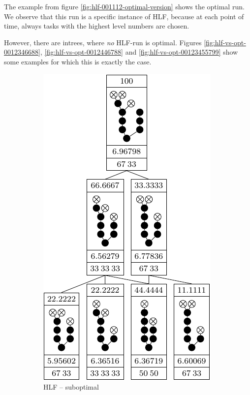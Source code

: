 The example from figure \ref{fig:hlf-001112-optimal-version} shows the optimal run. We observe that this run is a specific instance of HLF, because at each point of time, always tasks with the highest level numbers are chosen.

However, there are intrees, where \emph{no} HLF-run is optimal. Figures \ref{fig:hlf-vs-opt-0012346688}, \ref{fig:hlf-vs-opt-0012446788} and \ref{fig:hlf-vs-opt-00123455799} show some examples for which this is exactly the case.

\begin{figure}[ht]
  \centering
  \begin{subfigure}{.45\linewidth}
    \centering
    \includegraphics{p3/hlf_not_optimal/0012346688_subopt.pdf}
    \caption{HLF -- suboptimal}
  \end{subfigure}
  \begin{subfigure}{.45\linewidth}
    \centering

\end{subfigure}
\end{figure}
